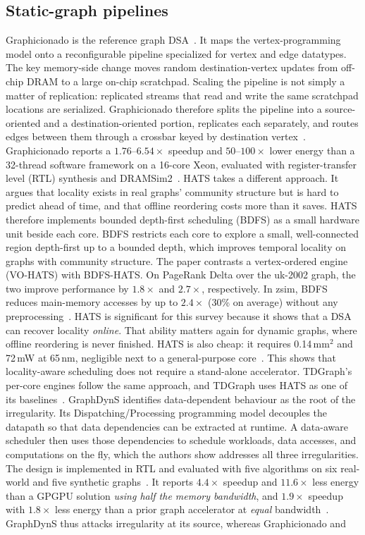 \documentclass[journal,onecolumn]{IEEEtran}
\begin{document}
\subsection{Static-graph pipelines}
Graphicionado is the reference graph DSA~\cite{ham2016graphicionado}. It maps the vertex-programming model onto a reconfigurable pipeline specialized for vertex and edge datatypes. The key memory-side change moves random destination-vertex updates from off-chip DRAM to a large on-chip scratchpad. Scaling the pipeline is not simply a matter of replication: replicated streams that read and write the same scratchpad locations are serialized. Graphicionado therefore splits the pipeline into a source-oriented and a destination-oriented portion, replicates each separately, and routes edges between them through a crossbar keyed by destination vertex~\cite{ham2016graphicionado}. Graphicionado reports a $1.76$--$6.54\times$ speedup and $50$--$100\times$ lower energy than a 32-thread software framework on a 16-core Xeon, evaluated with register-transfer level (RTL) synthesis and DRAMSim2~\cite{ham2016graphicionado}. HATS takes a different approach. It argues that locality exists in real graphs' community structure but is hard to predict ahead of time, and that offline reordering costs more than it saves. HATS therefore implements bounded depth-first scheduling (BDFS) as a small hardware unit beside each core. BDFS restricts each core to explore a small, well-connected region depth-first up to a bounded depth, which improves temporal locality on graphs with community structure. The paper contrasts a vertex-ordered engine (VO-HATS) with BDFS-HATS. On PageRank Delta over the uk-2002 graph, the two improve performance by $1.8\times$ and $2.7\times$, respectively. In zsim, BDFS reduces main-memory accesses by up to $2.4\times$ (30\% on average) without any preprocessing~\cite{mukkara2018hats}. HATS is significant for this survey because it shows that a DSA can recover locality \emph{online}. That ability matters again for dynamic graphs, where offline reordering is never finished. HATS is also cheap: it requires 0.14\,mm$^2$ and 72\,mW at 65\,nm, negligible next to a general-purpose core~\cite{mukkara2018hats}. This shows that locality-aware scheduling does not require a stand-alone accelerator. TDGraph's per-core engines follow the same approach, and TDGraph uses HATS as one of its baselines~\cite{zhao2022tdgraph}. GraphDynS identifies data-dependent behaviour as the root of the irregularity. Its Dispatching/Processing programming model decouples the datapath so that data dependencies can be extracted at runtime. A data-aware scheduler then uses those dependencies to schedule workloads, data accesses, and computations on the fly, which the authors show addresses all three irregularities. The design is implemented in RTL and evaluated with five algorithms on six real-world and five synthetic graphs~\cite{yan2019graphdyns}. It reports $4.4\times$ speedup and $11.6\times$ less energy than a GPGPU solution \emph{using half the memory bandwidth}, and $1.9\times$ speedup with $1.8\times$ less energy than a prior graph accelerator at \emph{equal} bandwidth~\cite{yan2019graphdyns}. GraphDynS thus attacks irregularity at its source, whereas Graphicionado and 
\end{document}

